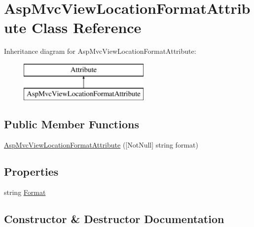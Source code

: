 \hypertarget{class_asp_mvc_view_location_format_attribute}{}\section{Asp\+Mvc\+View\+Location\+Format\+Attribute Class Reference}
\label{class_asp_mvc_view_location_format_attribute}
Inheritance diagram for Asp\+Mvc\+View\+Location\+Format\+Attribute\+:\begin{figure}[H]
\begin{center}
\leavevmode
\includegraphics[height=2.000000cm]{class_asp_mvc_view_location_format_attribute}
\end{center}
\end{figure}
\subsection*{Public Member Functions}
\begin{DoxyCompactItemize}
\item 
\mbox{\hyperlink{class_asp_mvc_view_location_format_attribute_a6ddefc248db498918b332664d19fb729}{Asp\+Mvc\+View\+Location\+Format\+Attribute}} (\mbox{[}Not\+Null\mbox{]} string format)
\end{DoxyCompactItemize}
\subsection*{Properties}
\begin{DoxyCompactItemize}
\item 
string \mbox{\hyperlink{class_asp_mvc_view_location_format_attribute_a3489b3971df02310fd8abb286247c4ae}{Format}}
\end{DoxyCompactItemize}


\subsection{Constructor \& Destructor Documentation}
\mbox{\label{class_asp_mvc_view_location_format_attribute_a6ddefc248db498918b332664d19fb729}} 
